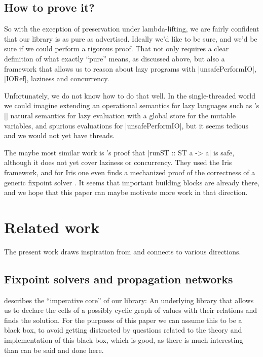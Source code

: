 \documentclass[manuscript,review,screen,acmsmall]{acmart}
\begin{document}
\subsection{How to prove it?}

So with the exception of preservation under lambda-lifting, we are fairly confident that our library is as pure as advertised. Ideally we'd like to be sure, and we’d be sure if we could perform a rigorous proof.  That not only requires a clear definition of what exactly “pure” means, as discussed above, but also a framework that allows us to reason about lazy programs with |unsafePerformIO|, |IORef|, laziness and concurrency.

Unfortunately, we do not know how to do that well. In the single-threaded world we could imagine extending an operational semantics for lazy languages such as \citeauthor{launchbury}’s [\citeyear{launchbury}] natural semantics for lazy evaluation with a global store for the mutable variables, and spurious evaluations for |unsafePerformIO|, but it seems tedious and we would not yet have threads.

The maybe most similar work is \citeauthor{runST}'s \citeyear{runST} proof that |runST :: ST a -> a| is safe, although it does not yet cover laziness or concurrency.
They used the Iris framework, and for Iris one even finds a mechanized proof of the correctness of a generic fixpoint solver \citep{spygame}.
It seems that important building blocks are already there, and we hope that this paper can maybe motivate more work in that direction.


\section{Related work}\label{sec:related}

The present work draws inspiration from and connects to various directions.

\subsection{Fixpoint solvers and propagation networks}

 describes the “imperative core” of our library: An underlying library that allows us to declare the cells of a possibly cyclic graph of values with their relations and finds the solution. For the purposes of this paper we can assume this to be a black box, to avoid getting distracted by questions related to the theory and implementation of this black box, which is good, as there is much interesting than can be said and done here.
\end{document}
